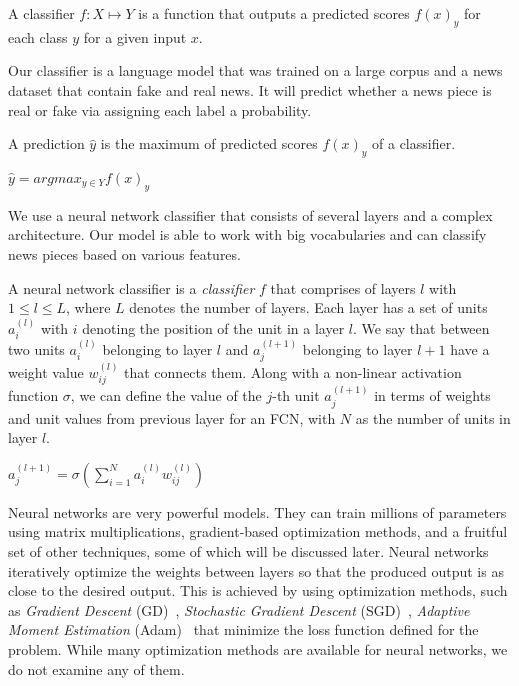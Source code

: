 \begin{definition}
    A classifier $f:X \mapsto Y$ is a function that outputs a predicted scores $f(x)_y$ for each class $y$ for a given input $x$.
\end{definition}
Our classifier is a language model that was trained on a large corpus and a news dataset that contain fake and real news. It will predict whether a news piece is real or fake via assigning each label a probability.
\begin{definition}
    A prediction $\hat{y}$ is the maximum of predicted scores $f(x)_y$ of a classifier.
    \begin{center}
        $\hat{y} = argmax_{y \in Y} f(x)_y$
    \end{center}
\end{definition}
We use a neural network classifier that consists of several layers and a complex architecture. Our model is able to work with big vocabularies and can classify news pieces based on various features.
\begin{definition}
    A neural network classifier is a \emph{classifier} $f$ that comprises of layers $l$ with $1 \leq l \leq L$, where $L$ denotes the number of layers. Each layer has a set of units $a_i^{(l)}$ with $i$ denoting the position of the unit in
    a layer $l$. We say that between two units $a_i^{(l)}$ belonging to layer $l$ and $a_j^{(l+1)}$ belonging to layer
    $l+1$ have a weight value $w_{ij}^{(l)}$ that connects them. Along with a non-linear activation function $\sigma$, we
    can define the value of the $j$-th unit $a_j^{(l+1)}$ in terms of weights and unit values from previous layer for an FCN, with $N$ as the number of units in layer $l$.
    \begin{center}
        $a_j^{(l+1)} = \sigma(\sum\limits_{i=1}^{N} a_i^{(l)} w_{ij}^{(l)})$
    \end{center}
\end{definition}
Neural networks are very powerful models. They can train millions of parameters using matrix multiplications, gradient-based optimization methods, and a fruitful set of other techniques, some of which will be discussed later. Neural networks iteratively optimize the weights between layers so that the produced output is as close to the desired output. This is achieved by using optimization methods, such as \emph{Gradient Descent} (GD)~\parencite{GD_Cauchy}, \emph{Stochastic Gradient Descent} (SGD)~\parencite{SGD_Robbins}, \emph{Adaptive Moment Estimation} (Adam)~\parencite{Adam_Kingma} that minimize the loss function defined for the problem. While many optimization methods are available for neural networks, we do not examine any of them.\\
